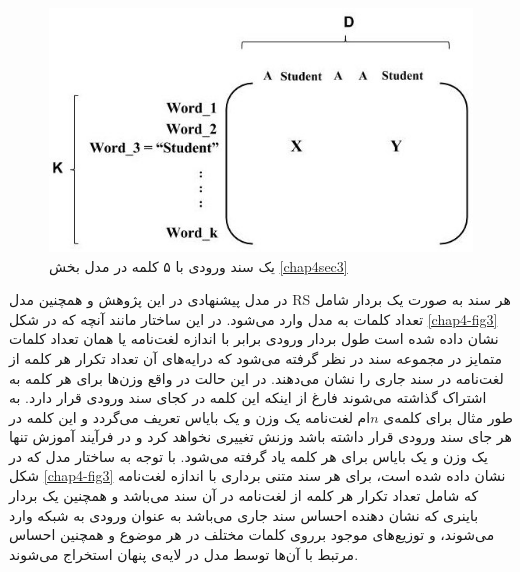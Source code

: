 \begin{figure}[!t]
	\centering
	\includegraphics[scale=0.4]{chap4-img/example}
	\caption{یک سند ورودی با ۵ کلمه در مدل بخش \ref{chap4sec3}}
	\label{chap4-fig4}
\end{figure}

در مدل پیشنهادی در این پژوهش و همچنین مدل
RS
هر سند به صورت یک بردار شامل تعداد کلمات به مدل وارد می‌‌شود. در این ساختار مانند آنچه که در شکل
\ref{chap4-fig3}
نشان داده شده است طول بردار ورودی برابر با اندازه لغت‌نامه یا همان تعداد کلمات متمایز در مجموعه سند در نظر گرفته می‌‌شود که درایه‌های آن تعداد تکرار هر کلمه از لغت‌نامه در سند جاری را نشان می‌‌دهند. در این حالت در واقع وزن‌ها برای هر کلمه به اشتراک گذاشته می‌‌شوند فارغ از اینکه این کلمه در کجای سند ورودی قرار دارد. به طور مثال برای کلمه‌ی‌
$n$ام 
لغت‌نامه یک وزن و یک بایاس تعریف می‌‌گردد و این کلمه در هر جای سند ورودی قرار داشته باشد وزنش تغییری نخواهد کرد و در فرآیند آموزش تنها یک وزن و یک بایاس برای هر کلمه یاد گرفته می‌‌شود. با توجه به ساختار مدل که در شکل
\ref{chap4-fig3}
نشان داده شده است، برای هر سند متنی برداری با اندازه لغت‌نامه که شامل تعداد تکرار هر کلمه از لغت‌نامه در آن سند می‌‌باشد و همچنین یک بردار باینری که نشان دهنده احساس سند جاری می‌‌باشد به عنوان ورودی به شبکه وارد می‌‌شوند، و توزیع‌های موجود برروی کلمات مختلف در هر موضوع و همچنین احساس مرتبط با آن‌ها توسط مدل در لایه‌‌ی پنهان استخراج می‌‌شوند.

